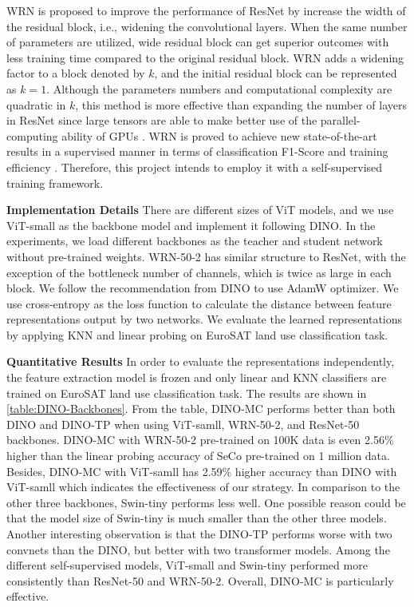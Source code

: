 \documentclass[10pt,twocolumn,letterpaper]{article}
\begin{document}
WRN \cite{zagoruyko2016wide} is proposed to improve the performance of ResNet by increase the width of the residual block, i.e., widening the convolutional layers.
When the same number of parameters are utilized, wide residual block can get superior outcomes with less training time compared to the original residual block.
WRN adds a widening factor to a block denoted by $k$, and the initial residual block can be represented as $k=1$. 
Although the parameters numbers and computational complexity are quadratic in $k$, this method is more effective than expanding the number of layers in ResNet since large tensors are able to make better use of the parallel-computing ability of GPUs \cite{zagoruyko2016wide}.
WRN is proved to achieve new state-of-the-art results in a supervised manner in terms of classification F1-Score and training efficiency \cite{papoutsis2021efficient}.
Therefore, this project intends to employ it with a self-supervised training framework.

\textbf{Implementation Details }
There are different sizes of ViT models, and we use ViT-small as the backbone model and implement it following DINO.
In the experiments, we load different backbones as the teacher and student network without pre-trained weights.
WRN-50-2 has similar structure to ResNet, with the exception of the bottleneck number of channels, which is twice as large in each block.
We follow the recommendation from DINO to use AdamW optimizer.
We use cross-entropy as the loss function to calculate the distance between feature representations output by two networks.
We evaluate the learned representations by applying KNN and linear probing on EuroSAT land use classification task.


\textbf{Quantitative Results}
In order to evaluate the representations independently, the feature extraction model is frozen and only linear and KNN classifiers are trained on EuroSAT land use classification task.
The results are shown in \cref{table:DINO-Backbones}.
From the table, DINO-MC performs better than both DINO and DINO-TP when using ViT-samll, WRN-50-2, and ResNet-50 backbones.
DINO-MC with WRN-50-2 pre-trained on 100K data is even 2.56\% higher than the linear probing accuracy of SeCo pre-trained on 1 million data.
Besides, DINO-MC with ViT-samll has 2.59\% higher accuracy than DINO with ViT-samll which indicates the effectiveness of our strategy.
In comparison to the other three backbones, Swin-tiny performs less well.
One possible reason could be that the model size of Swin-tiny is much smaller than the other three models.
Another interesting observation is that the DINO-TP performs worse with two convnets than the DINO, but better with two transformer models.
Among the different self-supervised models, ViT-small and Swin-tiny performed more consistently than ResNet-50 and WRN-50-2.
Overall, DINO-MC is particularly effective.
\end{document}
